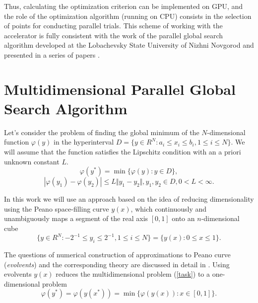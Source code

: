 \documentclass{svproc}
\begin{document}
Thus, calculating the optimization criterion can be implemented on GPU, and the role of the optimization algorithm (running on CPU) consists in the selection of points for conducting parallel trials. This scheme of working with the accelerator is fully consistent with the work of the parallel global search algorithm developed at the Lobachevsky State University of Nizhni Novgorod and presented in a series of papers \cite{Barkalov2014,Barkalov2020,Barkalov2019,Grishagin2016,Grishagin2015,Grishagin2018,globalizerSystem}.


\section{Multidimensional Parallel Global Search Algorithm}\label{Sec_GSA}
Let's consider the problem of finding the global minimum of the \(N\)-dimensional function \(\varphi(y)\) in the hyperinterval  \(D=\{y\in R^N:a_i\leqslant x_i\leqslant{b_i}, 1\leqslant{i}\leqslant{N}\}\).  We will assume that the function satisfies the Lipschitz condition with an a priori unknown constant \(L\).
\begin{equation}
\label{task}
\varphi(y^*)=\min\{\varphi(y):y\in D\},
\end{equation}
\begin{equation}
\label{lip}
|\varphi(y_1)-\varphi(y_2)|\leqslant L\Vert y_1-y_2\Vert,y_1,y_2\in D,0<L<\infty.
\end{equation}

In this work we will use an approach based on the idea of reducing dimensionality using the Peano space-filling curve \(y(x)\), which continuously and unambiguously maps a segment of the real axis \([0,1]\) onto an \(n\)-dimensional cube
\begin{equation}
\label{cube}
\lbrace y\in R^N:-2^{-1}\leqslant y_i\leqslant 2^{-1},1\leqslant i\leqslant N\rbrace=\{y(x):0\leqslant x\leqslant 1\}.
\end{equation}

The questions of numerical construction of approximations to Peano curve (\textit{evolvents}) and the corresponding theory are discussed in detail in \cite{Sergeyev2013,Strongin2000}. Using evolvents \(y(x)\) reduces the multidimensional problem (\ref{task}) to a one-dimensional problem
\begin{displaymath}
\label{oneDimTask}
\varphi(y^*)=\varphi(y(x^*))=\min\{\varphi(y(x)):x\in [0,1]\}.
\end{displaymath}
\end{document}
